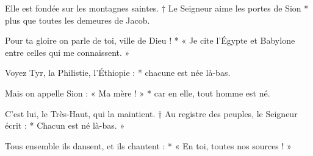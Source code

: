 \item Elle est fondée sur les montagnes saintes. † Le Seigneur aime les portes de Sion * plus que toutes les demeures de Jacob.
\item Pour ta gloire on parle de toi, ville de Dieu ! * « Je cite l'Égypte et Babylone entre celles qui me connaissent. »
\item Voyez Tyr, la Philistie, l'Éthiopie : * chacune est née là-bas.
\item Mais on appelle Sion : « Ma mère ! » * car en elle, tout homme est né. 
\item C'est lui, le Très-Haut, qui la maintient. † Au registre des peuples, le Seigneur écrit : * Chacun est né là-bas. »
\item Tous ensemble ils dansent, et ils chantent : * « En toi, toutes nos sources ! »
